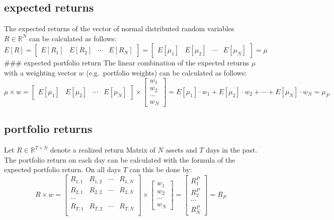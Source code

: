 \documentclass[
  oneside]{book}
\begin{document}
\hypertarget{expected-returns}{%
\subsection{expected returns}\label{expected-returns}}

The expected returns of the vector of normal distributed random variables \(R \in \mathbb{R}^{N}\) can be calculated as follows:
\[
  E[R] =
  \begin{bmatrix}
    E[R_{1}] & E[R_{2}] & \cdots & E[R_{N}]  
 \end{bmatrix}
 =
 \begin{bmatrix}
    E[\mu_{1}] & E[\mu_{2}] & \cdots & E[\mu_{N}]  
 \end{bmatrix}
 =
 \mu
\]
\#\#\# expected portfolio return
The linear combination of the expected returns \(\mu\) with a weighting vector \(w\) (e.g.~portfolio weights) can be calculated as follows:
\[
 \mu \times w =
  \begin{bmatrix}
    E[\mu_{1}] & E[\mu_{2}] & \cdots & E[\mu_{N}]
 \end{bmatrix}
  \times 
  \begin{bmatrix}
    w_{1} \\ 
    w_{2} \\
    \cdots \\
    w_{N}  
 \end{bmatrix}
 =
 E[\mu_{1}] \cdot w_1 + E[\mu_{2}] \cdot w_2 + \cdots + E[\mu_{N}] \cdot w_{N} 
 =
 \mu_P
\]

\hypertarget{portfolio-returns}{%
\subsection{portfolio returns}\label{portfolio-returns}}

Let \(R \in \mathbb{R}^{T \times N}\) denote a realized return Matrix of \(N\) assets and \(T\) days in the past. The portfolio return on each day can be calculated with the formula of the expected portfolio return. On all days \(T\) can this be done by:
\[
  R \times w = 
  \begin{bmatrix}
    R_{1, 1} & R_{1, 2} & \cdots & R_{1, N} \\
    R_{2, 1} & R_{2, 2} & \cdots & R_{2, N} \\
    \cdots \\
    R_{T, 1} & R_{T, 2} & \cdots & R_{T, N} \\
 \end{bmatrix}
  \times 
  \begin{bmatrix}
    w_{1} \\ 
    w_{2} \\
    \cdots \\
    w_{N}  
 \end{bmatrix}
 =
   \begin{bmatrix}
    R_{1}^P \\ 
    R_{2}^P \\
    \cdots \\
    R_{N}^P  
 \end{bmatrix}
 =
 R_P
\]
\end{document}
